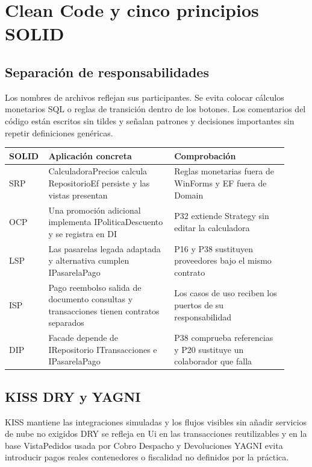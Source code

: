 
\section{Clean Code y cinco principios SOLID}
\subsection{Separación de responsabilidades}
Los nombres de archivos reflejan sus participantes. Se evita colocar cálculos monetarios SQL o reglas de transición dentro de los botones. Los comentarios del código están escritos sin tildes y señalan patrones y decisiones importantes sin repetir definiciones genéricas.
\begingroup\small
\noindent
\begin{tabular}{@{}>{\raggedright\arraybackslash}p{0.1\linewidth}>{\raggedright\arraybackslash}p{0.43\linewidth}>{\raggedright\arraybackslash}p{0.39\linewidth}@{}}
\toprule
\textbf{SOLID} & \textbf{Aplicación concreta} & \textbf{Comprobación}\\
\midrule
SRP & CalculadoraPrecios calcula RepositorioEf persiste y las vistas presentan & Reglas monetarias fuera de WinForms y EF fuera de Domain\\[3pt]
OCP & Una promoción adicional implementa IPoliticaDescuento y se registra en DI & P32 extiende Strategy sin editar la calculadora\\[3pt]
LSP & Las pasarelas legada adaptada y alternativa cumplen IPasarelaPago & P16 y P38 sustituyen proveedores bajo el mismo contrato\\[3pt]
ISP & Pago reembolso salida de documento consultas y transacciones tienen contratos separados & Los casos de uso reciben los puertos de su responsabilidad\\[3pt]
DIP & Facade depende de IRepositorio ITransacciones e IPasarelaPago & P38 comprueba referencias y P20 sustituye un colaborador que falla\\[3pt]
\bottomrule
\end{tabular}
\par\endgroup

\subsection{KISS DRY y YAGNI}
KISS mantiene las integraciones simuladas y los flujos visibles sin añadir servicios de nube no exigidos DRY se refleja en Ui en las transacciones reutilizables y en la base VistaPedidos usada por Cobro Despacho y Devoluciones YAGNI evita introducir pagos reales contenedores o fiscalidad no definidos por la práctica.

